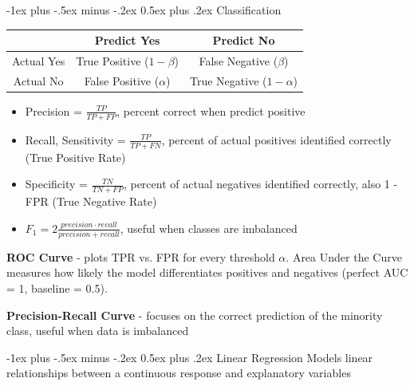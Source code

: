 \documentclass[10pt,landscape]{article}
\makeatletter
\renewcommand{\section}{\@startsection{section}{1}{0mm}%
                                {-1ex plus -.5ex minus -.2ex}%
                                {0.5ex plus .2ex}%
                                {\normalfont\large\bfseries}}
\renewcommand{\subsection}{\@startsection{subsection}{2}{0mm}%
                                {-1ex plus -.5ex minus -.2ex}%
                                {0.5ex plus .2ex}%
                                {\normalfont\normalsize\bfseries}}
\makeatother
\begin{document}
\begin{multicols}{3}
    \renewcommand{\tabcolsep}{5pt}
    \subsection{Classification}
    \begin{center}
        \footnotesize
        \begin{tabular}{ |c|c|c| }
            \hline
                       & Predict Yes               & Predict No                 \\
            \hline
            Actual Yes & True Positive ($1-\beta$) & False Negative ($\beta$)   \\
            Actual No  & False Positive ($\alpha$) & True Negative ($1-\alpha$) \\
            \hline
        \end{tabular}
    \end{center}
    \vspace{-1mm}
    \begin{itemize}[label={--},leftmargin=4mm]
        \vspace{-1mm}
        \itemsep -.4mm
        \item Precision = $\frac{TP}{TP + FP}$, percent correct when predict positive
        \item Recall, Sensitivity = $\frac{TP}{TP + FN}$, percent of actual positives identified correctly (True Positive Rate)
        \item Specificity = $\frac{TN}{TN + FP}$, percent of actual negatives identified correctly, also 1 - FPR (True Negative Rate)
        \item $F_1 = 2\frac{precision\cdot recall}{precision + recall}$, useful when classes are imbalanced
    \end{itemize}


    \textbf{ROC Curve} - plots TPR vs. FPR for every threshold $\alpha$. Area Under the Curve  measures how likely the model differentiates positives and negatives (perfect AUC = 1, baseline = 0.5).

    \textbf{Precision-Recall Curve} - focuses on the correct prediction of the minority class, useful when data is imbalanced

    \section{Linear Regression}
    Models linear relationships between a continuous response and explanatory variables


\end{multicols}
\end{document}
